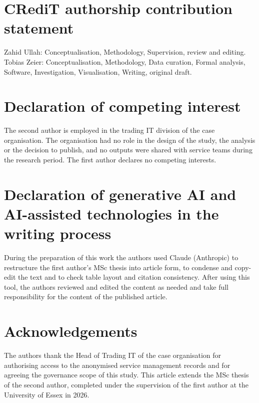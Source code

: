\documentclass[
  authoryear,
  preprint]{elsarticle}
\begin{document}
\section*{CRediT authorship contribution
statement}\label{credit-authorship-contribution-statement}

Zahid Ullah: Conceptualisation, Methodology, Supervision, review and
editing. Tobias Zeier: Conceptualisation, Methodology, Data curation,
Formal analysis, Software, Investigation, Visualisation, Writing,
original draft.

\section*{Declaration of competing
interest}\label{declaration-of-competing-interest}

The second author is employed in the trading IT division of the case
organisation. The organisation had no role in the design of the study,
the analysis or the decision to publish, and no outputs were shared with
service teams during the research period. The first author declares no
competing interests.

\section*{Declaration of generative AI and AI-assisted technologies in
the writing
process}\label{declaration-of-generative-ai-and-ai-assisted-technologies-in-the-writing-process}

During the preparation of this work the authors used Claude (Anthropic)
to restructure the first author's MSc thesis into article form, to
condense and copy-edit the text and to check table layout and citation
consistency. After using this tool, the authors reviewed and edited the
content as needed and take full responsibility for the content of the
published article.

\section*{Acknowledgements}\label{acknowledgements}

The authors thank the Head of Trading IT of the case organisation for
authorising access to the anonymised service management records and for
agreeing the governance scope of this study. This article extends the
MSc thesis of the second author, completed under the supervision of the
first author at the University of Essex in 2026.
\end{document}
